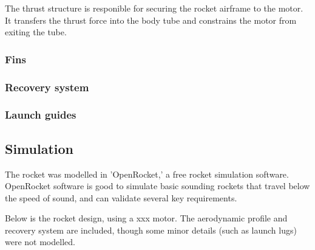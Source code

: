 \documentclass{article}
\begin{document}
            The thrust structure is responible for securing the rocket airframe to the motor.
            It transfers the thrust force into the body tube and constrains the motor from exiting the tube.

        
        \subsubsection{Fins}
        
        
        \subsubsection{Recovery system}
        
            
        
        \subsubsection{Launch guides}
        

    \subsection{Simulation}
    
        The rocket was modelled in 'OpenRocket,' a free rocket simulation software.
        OpenRocket software is good to simulate basic sounding rockets that travel below the speed of sound, and can validate several key requirements.
        
        Below is the rocket design, using a xxx motor.
        The aerodynamic profile and recovery system are included, though some minor details (such as launch lugs) were not modelled.
        
\end{document}
